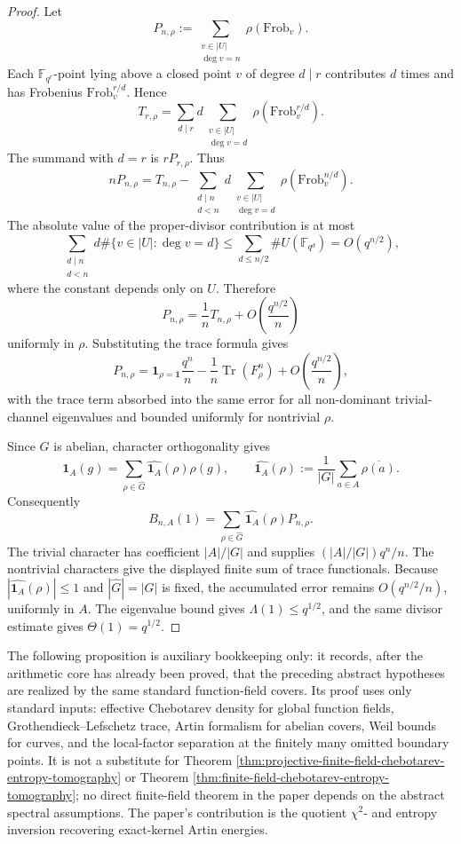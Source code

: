 \documentclass[12pt,a4paper]{article}
\theoremstyle{plain}
\theoremstyle{definition}
\numberwithin{equation}{section}
\DeclareMathOperator{\Tr}{Tr}
\newcommand{\FF}{\mathbb{F}}
\newcommand{\ind}{\mathbf{1}}
\begin{document}
\begin{proof}
Let
\[
P_{n,\rho}:=\sum_{\substack{v\in |U|\\ \deg v=n}}\rho(\mathrm{Frob}_v).
\]
Each \(\FF_{q^r}\)-point lying above a closed point \(v\) of degree \(d\mid r\) contributes \(d\) times and has Frobenius \(\mathrm{Frob}_v^{r/d}\). Hence
\[
T_{r,\rho}=\sum_{d\mid r}d\sum_{\substack{v\in |U|\\ \deg v=d}}\rho(\mathrm{Frob}_v^{r/d}).
\]
The summand with \(d=r\) is \(rP_{r,\rho}\). Thus
\[
nP_{n,\rho}=T_{n,\rho}-\sum_{\substack{d\mid n\\ d<n}}d\sum_{\substack{v\in |U|\\ \deg v=d}}\rho(\mathrm{Frob}_v^{n/d}).
\]
The absolute value of the proper-divisor contribution is at most
\[
\sum_{\substack{d\mid n\\ d<n}}d\#\{v\in |U|:\deg v=d\}
\le \sum_{d\le n/2}\#U(\FF_{q^d})
=O(q^{n/2}),
\]
where the constant depends only on \(U\). Therefore
\[
P_{n,\rho}=\frac1nT_{n,\rho}+O\!\left(\frac{q^{n/2}}{n}\right)
\]
uniformly in \(\rho\). Substituting the trace formula gives
\[
P_{n,\rho}=\mathbf 1_{\rho=\ind}\frac{q^n}{n}-\frac1n\Tr(F_\rho^n)+O\!\left(\frac{q^{n/2}}{n}\right),
\]
with the trace term absorbed into the same error for all non-dominant trivial-channel eigenvalues and bounded uniformly for nontrivial \(\rho\).

Since \(G\) is abelian, character orthogonality gives
\[
\mathbf 1_A(g)=\sum_{\rho\in\widehat G}\widehat{\mathbf 1_A}(\rho)\rho(g),
\qquad
\widehat{\mathbf 1_A}(\rho):=\frac1{|G|}\sum_{a\in A}\overline{\rho(a)}.
\]
Consequently
\[
B_{n,A}(1)=\sum_{\rho\in\widehat G}\widehat{\mathbf 1_A}(\rho)P_{n,\rho}.
\]
The trivial character has coefficient \(|A|/|G|\) and supplies \((|A|/|G|)q^n/n\). The nontrivial characters give the displayed finite sum of trace functionals. Because \(|\widehat{\mathbf 1_A}(\rho)|\le1\) and \(|\widehat G|=|G|\) is fixed, the accumulated error remains \(O(q^{n/2}/n)\), uniformly in \(A\). The eigenvalue bound gives \(\Lambda(1)\le q^{1/2}\), and the same divisor estimate gives \(\Theta(1)=q^{1/2}\).
\end{proof}

The following proposition is auxiliary bookkeeping only: it records, after the arithmetic core has already been proved, that the preceding abstract hypotheses are realized by the same standard function-field covers. Its proof uses only standard inputs: effective Chebotarev density for global function fields, Grothendieck--Lefschetz trace, Artin formalism for abelian covers, Weil bounds for curves, and the local-factor separation at the finitely many omitted boundary points. It is not a substitute for Theorem \ref{thm:projective-finite-field-chebotarev-entropy-tomography} or Theorem \ref{thm:finite-field-chebotarev-entropy-tomography}; no direct finite-field theorem in the paper depends on the abstract spectral assumptions. The paper's contribution is the quotient \(\chi^2\)- and entropy inversion recovering exact-kernel Artin energies.
\end{document}
